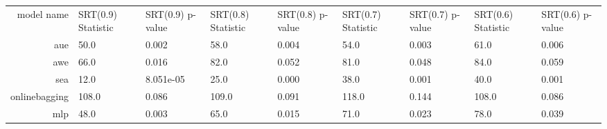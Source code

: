 \begin{tabular}{|r|l|l|l|l|l|l|l|l|}
  \hline
  model name & SRT(0.9) Statistic & SRT(0.9) p-value & SRT(0.8) Statistic & SRT(0.8) p-value & SRT(0.7) Statistic & SRT(0.7) p-value & SRT(0.6) Statistic & SRT(0.6) p-value \\ 
  aue & 50.0 & 0.002 & 58.0 & 0.004 & 54.0 & 0.003 & 61.0 & 0.006 \\ 
  awe & 66.0 & 0.016 & 82.0 & 0.052 & 81.0 & 0.048 & 84.0 & 0.059 \\ 
  sea & 12.0 & 8.051e-05 & 25.0 & 0.000 & 38.0 & 0.001 & 40.0 & 0.001 \\ 
  onlinebagging & 108.0 & 0.086 & 109.0 & 0.091 & 118.0 & 0.144 & 108.0 & 0.086 \\ 
  mlp & 48.0 & 0.003 & 65.0 & 0.015 & 71.0 & 0.023 & 78.0 & 0.039 \\ 
\end{tabular}
